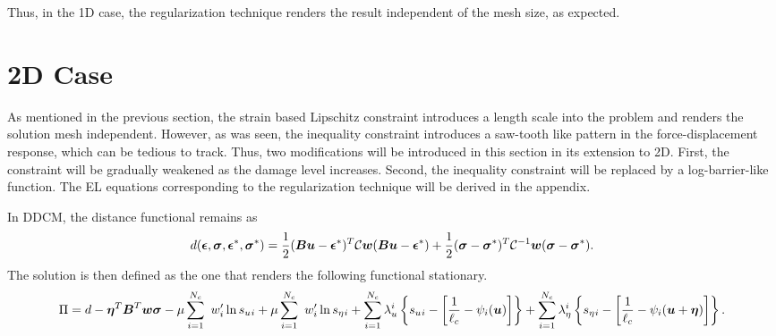 \documentclass[12pt]{elsarticle}
\begin{document}
Thus, in the 1D case, the regularization technique renders the result independent of the mesh size, as expected.

\section{2D Case}

As mentioned in the previous section, the strain based Lipschitz constraint introduces a length scale into the problem and renders the solution mesh independent. However, as was seen, the inequality constraint introduces a saw-tooth like pattern in the force-displacement response, which can be tedious to track. Thus, two modifications will be introduced in this section in its extension to 2D. First, the constraint will be gradually weakened as the damage level increases. Second, the inequality constraint will be replaced by a log-barrier-like function. The EL equations corresponding to the regularization technique will be derived in the appendix.

In DDCM, the distance functional remains as
\begin{equation}
	d(\mbox{\boldmath $\epsilon$},\mbox{\boldmath $\sigma$},\mbox{\boldmath $\epsilon$}^*,\mbox{\boldmath $\sigma$}^*) = \frac{1}{2}(\mbox{\boldmath $B$} \mbox{\boldmath $u$} - \mbox{\boldmath $\epsilon$}^*)^T\mathcal{C}\mbox{\boldmath $w$}(\mbox{\boldmath $B$} \mbox{\boldmath $u$} - \mbox{\boldmath $\epsilon$}^*) + \frac{1}{2}(\mbox{\boldmath $\sigma$} - \mbox{\boldmath $\sigma$}^*)^T\mathcal{C}^{-1}\mbox{\boldmath $w$}(\mbox{\boldmath $\sigma$} - \mbox{\boldmath $\sigma$}^*).
\end{equation}
The solution is then defined as the one that renders the following functional stationary.
\begin{equation}
	\Pi  = d -\mbox{\boldmath $\eta$} ^T \mbox{\boldmath $B$}^T \mbox{\boldmath $w$} \mbox{\boldmath $\sigma$} - \mu \sum_{i=1}^{N_c} \
	w_i' \ln s_u{_i} + \mu \sum_{i=1}^{N_c} \
	w_i' \ln s_\eta{_i} +\sum_{i=1}^{N_c} \lambda_u^ i \left\{ s_u{_i}  - \left[ \frac{1}{\ell_c}- \psi_i(\mbox{\boldmath $u$}) \right]  \right\} 
	+\sum_{i=1}^{N_c} \lambda_\eta^ i \left\{ s_\eta{_i}  - \left[ \frac{1}{\ell_c}- \psi_i(\mbox{\boldmath $u$}+\mbox{\boldmath $\eta$}) \right]  \right\}.
\end{equation}
\end{document}
